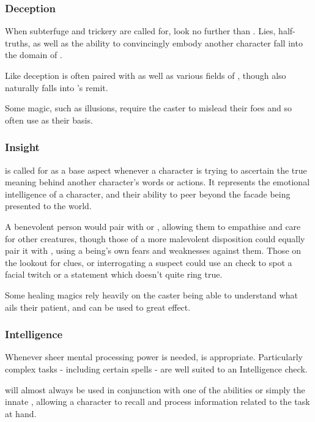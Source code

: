 \subsubsection{Deception}

When subterfuge and trickery are called for, look no further than . Lies, half-truths, as well as the ability to convincingly embody another character fall into the domain of . 

Like  deception is often paired with  as well as various fields of , though  also naturally falls into 's remit. 

Some magic, such as illusions, require the caster to mislead their foes and so often use  as their basis. 


\subsubsection{Insight}

 is called for as a base aspect whenever a character is trying to ascertain the true meaning behind another character's words or actions. It represents the emotional intelligence of a character, and their ability to peer beyond the facade being presented to the world. 

A benevolent person would pair  with  or , allowing them to empathise and care for other creatures, though those of a more malevolent disposition could equally pair it with , using a being's own fears and weaknesses against them. Those on the lookout for clues, or interrogating a suspect could use an  check to spot a facial twitch or a statement which doesn't quite ring true.

Some healing magics rely heavily on the caster being able to understand what ails their patient, and  can be used to great effect.  

\subsubsection{Intelligence}

Whenever sheer mental processing power is needed,  is appropriate. Particularly complex tasks - including certain spells - are well suited to an Intelligence check.

 will almost always be used in conjunction with one of the  abilities or simply the innate , allowing a character to recall and process information related to the task at hand. 

